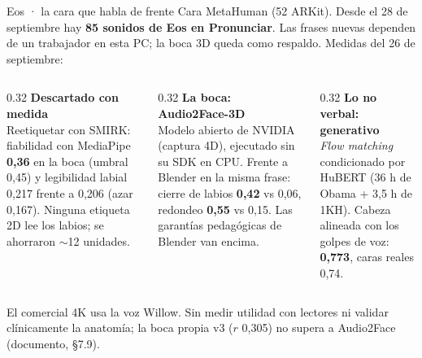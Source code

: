 \documentclass[aspectratio=169,11pt]{beamer}
\begin{document}
\begin{frame}{Eos · la cara que habla de frente}
\vspace{1mm}
{\small Cara MetaHuman (52 ARKit). Desde el 28 de septiembre hay
\textbf{85 sonidos de Eos en Pronunciar}. Las frases nuevas dependen de un
trabajador en esta PC; la boca 3D queda como respaldo. Medidas del 26 de septiembre:}
\vspace{2mm}

\begin{columns}[T]
\begin{column}{0.32\textwidth}
\textbf{\color{llazul} Descartado con medida}\\[2pt]
{\small Reetiquetar con SMIRK: fiabilidad con MediaPipe \textbf{0,36} en la boca (umbral
0,45) y legibilidad labial 0,217 frente a 0,206 (azar 0,167). Ninguna etiqueta 2D lee los
labios; se ahorraron $\sim$12 unidades.}
\end{column}
\begin{column}{0.32\textwidth}
\textbf{\color{llazul} La boca: Audio2Face-3D}\\[2pt]
{\small Modelo abierto de NVIDIA (captura 4D), ejecutado sin su SDK en CPU. Frente a
Blender en la misma frase: cierre de labios \textbf{0,42} vs 0,06, redondeo \textbf{0,55}
vs 0,15. Las garantías pedagógicas de Blender van encima.}
\end{column}
\begin{column}{0.32\textwidth}
\textbf{\color{llazul} Lo no verbal: generativo}\\[2pt]
{\small \emph{Flow matching} condicionado por HuBERT (36 h de Obama + 3,5 h de 1KH).
Cabeza alineada con los golpes de voz: \textbf{0,773}, caras reales 0,74.}
\end{column}
\end{columns}

\vspace{4mm}
{\footnotesize\color{llgris} El comercial 4K usa la voz Willow. Sin medir utilidad con
lectores ni validar clínicamente la anatomía; la boca propia v3 ($r$ 0,305) no
supera a Audio2Face (documento, §7.9).}
\end{frame}
\end{document}
